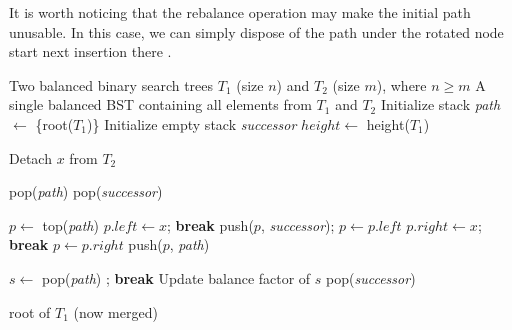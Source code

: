 \documentclass[12pt]{article}
\begin{document}
It is worth noticing that the rebalance operation may make the initial path unusable. In this case, we can simply dispose of the path under the rotated node start next insertion there \cite{brown1979fast}. 

\begin{tcolorbox}[breakable, colback=orange!5!white, colframe=orange!75!black, title=Algorithm: Brown and Tarjan's Merging Algorithm]
\begin{algorithmic}[1]
\Require Two balanced binary search trees $T_1$ (size $n$) and $T_2$ (size $m$), where $n \ge m$
\Ensure A single balanced BST containing all elements from $T_1$ and $T_2$
    \State Initialize stack \textit{path} $\gets$ \{root($T_1$)\}
    \State Initialize empty stack \textit{successor}
    \State $height \gets$ height($T_1$)

        \State Detach $x$ from $T_2$ 

            \Repeat
                \State pop(\textit{path})
            \State pop(\textit{successor})
        \EndWhile

        \State $p \gets$ top(\textit{path})
                    \State $p.left \gets x$; \textbf{break}
                \Else
                    \State push($p$, \textit{successor}); $p \gets p.left$
                \EndIf
            \Else
                    \State $p.right \gets x$; \textbf{break}
                \Else
                    \State $p \gets p.right$
                \EndIf
            \EndIf
            \State push($p$, \textit{path})
        \EndWhile

            \State $s \gets$ pop(\textit{path})
                \State {}; \textbf{break}
            \Else
                \State Update balance factor of $s$
            \EndIf
                \State pop(\textit{successor})
            \EndIf
        \EndWhile
    \EndFor

    \State \Return root of $T_1$ (now merged)
\EndProcedure
\end{algorithmic}
\end{tcolorbox}
\end{document}
